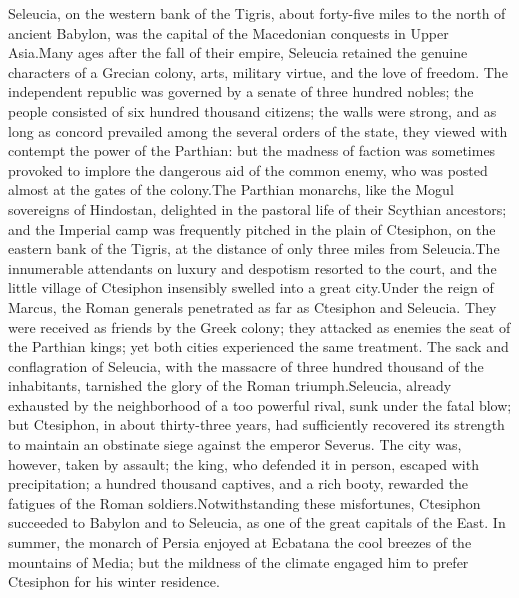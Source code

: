 Seleucia, on the western bank of the Tigris, about forty-five
miles to the north of ancient Babylon, was the capital of the
Macedonian conquests in Upper Asia.\footnotemark[38] Many ages after the fall
of their empire, Seleucia retained the genuine characters of a
Grecian colony, arts, military virtue, and the love of freedom.
The independent republic was governed by a senate of three
hundred nobles; the people consisted of six hundred thousand
citizens; the walls were strong, and as long as concord prevailed
among the several orders of the state, they viewed with contempt
the power of the Parthian: but the madness of faction was
sometimes provoked to implore the dangerous aid of the common
enemy, who was posted almost at the gates of the colony.\footnotemark[39] The
Parthian monarchs, like the Mogul sovereigns of Hindostan,
delighted in the pastoral life of their Scythian ancestors; and
the Imperial camp was frequently pitched in the plain of
Ctesiphon, on the eastern bank of the Tigris, at the distance of
only three miles from Seleucia.\footnotemark[40] The innumerable attendants on
luxury and despotism resorted to the court, and the little
village of Ctesiphon insensibly swelled into a great city.\footnotemark[41]
Under the reign of Marcus, the Roman generals penetrated as far
as Ctesiphon and Seleucia. They were received as friends by the
Greek colony; they attacked as enemies the seat of the Parthian
kings; yet both cities experienced the same treatment. The sack
and conflagration of Seleucia, with the massacre of three hundred
thousand of the inhabitants, tarnished the glory of the Roman
triumph.\footnotemark[42] Seleucia, already exhausted by the neighborhood of a
too powerful rival, sunk under the fatal blow; but Ctesiphon, in
about thirty-three years, had sufficiently recovered its strength
to maintain an obstinate siege against the emperor Severus. The
city was, however, taken by assault; the king, who defended it in
person, escaped with precipitation; a hundred thousand captives,
and a rich booty, rewarded the fatigues of the Roman soldiers.\footnotemark[43]
Notwithstanding these misfortunes, Ctesiphon succeeded to Babylon
and to Seleucia, as one of the great capitals of the East. In
summer, the monarch of Persia enjoyed at Ecbatana the cool
breezes of the mountains of Media; but the mildness of the
climate engaged him to prefer Ctesiphon for his winter residence.


